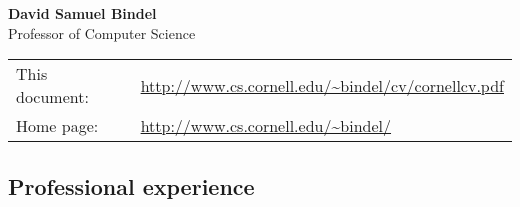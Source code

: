 \documentclass{article}
\begin{document}
\begin{center}
  {\Large \bf David Samuel Bindel} \\
  Professor of Computer Science \\[5mm]
  \begin{tabular}{ll}
  This document: & \url{http://www.cs.cornell.edu/~bindel/cv/cornellcv.pdf} \\
  Home page: & \url{http://www.cs.cornell.edu/~bindel/}
  \end{tabular}
\end{center}


\subsection*{Professional experience}
\end{document}
